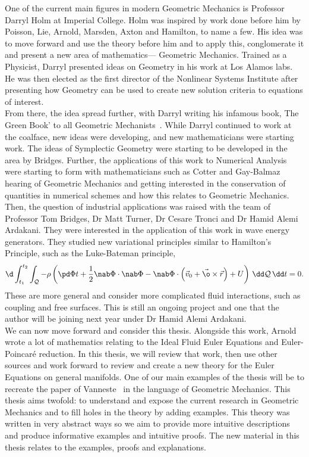 \noindent
One of the current main figures in modern Geometric Mechanics is Professor Darryl Holm at Imperial College. Holm was inspired by work done before him by Poisson, Lie, Arnold, Marsden, Axton and Hamilton, to name a few. His idea was to move forward and use the theory before him and to apply this, conglomerate it and present a new area of mathematics— Geometric Mechanics. Trained as a Physicist, Darryl presented ideas on Geometry in his work at Los Alamos labs. He was then elected as the first director of the Nonlinear Systems Institute after presenting how Geometry can be used to create new solution criteria to equations of interest.\\

\noindent
From there, the idea spread further, with Darryl writing his infamous book, The Green Book' to all Geometric Mechanists~\cite{holm}. While Darryl continued to work at the coalface, new ideas were developing, and new mathematicians were starting work. The ideas of Symplectic Geometry were starting to be developed in the area by Bridges. Further, the applications of this work to Numerical Analysis were starting to form with mathematicians such as Cotter and Gay-Balmaz hearing of Geometric Mechanics and getting interested in the conservation of quantities in numerical schemes and how this relates to Geometric Mechanics. \\

\noindent
Then, the question of industrial applications was raised with the team of Professor Tom Bridges, Dr Matt Turner, Dr Cesare Tronci and Dr Hamid Alemi Ardakani. They were interested in the application of this work in wave energy generators. They studied new variational principles similar to Hamilton's Principle, such as the Luke-Bateman principle,
$$ \d\int_{t_1}^{t_2}\int_{\mathcal{Q}} - \rho \left( \pd \Phi t + \frac{1}{2}\nab\Phi \cdot \nab \Phi - \nab\Phi \cdot \left( \vec v_0 + \vec \o \times \vec r \right) + U \right)\, \dd \mathcal{Q}\,\dd t = 0. $$
These are more general and consider more complicated fluid interactions, such as coupling and free surfaces. This is still an ongoing project and one that the author will be joining next year under Dr Hamid Alemi Ardakani.\\

\noindent
We can now move forward and consider this thesis. Alongside this work, Arnold wrote a lot of mathematics relating to the Ideal Fluid Euler Equations and Euler-Poincar\'e reduction. In this thesis, we will review that work, then use other sources and work forward to review and create a new theory for the Euler Equations on general manifolds. One of our main examples of the thesis will be to recreate the paper of Vanneste~\cite{vanneste_2021} in the language of Geometric Mechanics. This thesis aims twofold: to understand and expose the current research in Geometric Mechanics and to fill holes in the theory by adding examples. This theory was written in very abstract ways so we aim to provide more intuitive descriptions and produce informative examples and intuitive proofs. The new material in this thesis relates to the examples, proofs and explanations.\\

